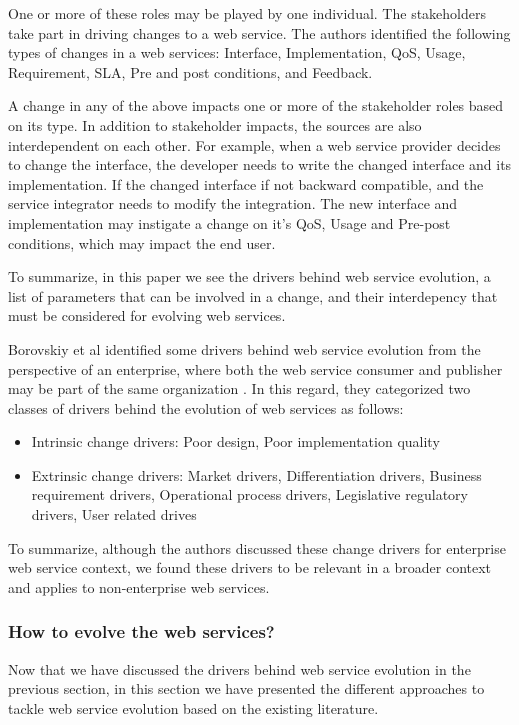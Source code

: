 \documentclass[runningheads,a4paper]{llncs}
\begin{document}
One or more of these roles may be played by one individual. The stakeholders take part in driving changes to a web service. The authors identified the following types of changes in a web services: Interface, Implementation, QoS, Usage, Requirement, SLA, Pre and post conditions, and Feedback.

A change in any of the above impacts one or more of the stakeholder roles based on its type. In addition to stakeholder impacts, the sources are also interdependent on each other. For example, when a web service provider decides to change the interface, the developer needs to write the changed interface and its implementation. If the changed interface if not backward compatible, and the service integrator needs to modify the integration. The new interface and implementation may instigate a change on it’s QoS, Usage and Pre-post conditions, which may impact the end user.

To summarize, in this paper we see the drivers behind web service evolution, a list of parameters that can be involved in a change, and their interdepency that must be considered for evolving web services.

Borovskiy et al identified some drivers behind web service evolution from the perspective of an enterprise, where both the web service consumer and publisher may be part of the same organization \cite{borovskiy2008evolution}. In this regard, they categorized two classes of drivers behind the evolution of web services as follows:

\begin{itemize}
  \item Intrinsic change drivers: Poor design, Poor implementation quality
  \item Extrinsic change drivers: Market drivers, Differentiation drivers, Business requirement drivers, Operational process drivers, Legislative regulatory drivers, User related drives
\end{itemize}

To summarize, although the authors discussed these change drivers for enterprise web service context, we found these drivers to be relevant in a broader context and applies to non-enterprise web services.

\subsubsection{How to evolve the web services?} %
\label{sub:how_to_evolve_the_web_services_}
Now that we have discussed the drivers behind web service evolution in the previous section, in this section we have presented the different approaches to tackle web service evolution based on the existing literature.
\end{document}
